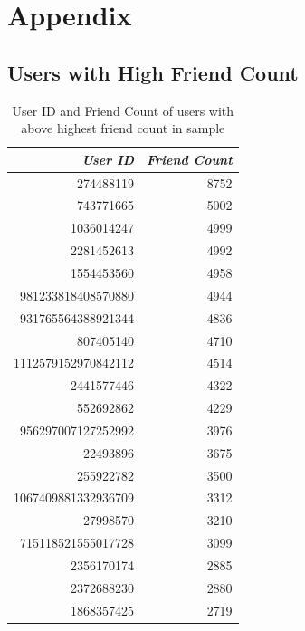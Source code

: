 \documentclass[11pt]{article}
\begin{document}
\section{Appendix}
\label{sec:org1439966}
\subsection{Users with High Friend Count}
\label{sec:orgd18754b}

\begin{table}[htbp]
\caption{\label{tab:org46b5638}User ID and Friend Count of users with above highest friend count in sample}
\centering
\begin{tabular}{rr}
\textbf{\emph{User ID}} & \textbf{\emph{Friend Count}}\\
\hline
274488119 & 8752\\
743771665 & 5002\\
1036014247 & 4999\\
2281452613 & 4992\\
1554453560 & 4958\\
981233818408570880 & 4944\\
931765564388921344 & 4836\\
807405140 & 4710\\
1112579152970842112 & 4514\\
2441577446 & 4322\\
552692862 & 4229\\
956297007127252992 & 3976\\
22493896 & 3675\\
255922782 & 3500\\
1067409881332936709 & 3312\\
27998570 & 3210\\
715118521555017728 & 3099\\
2356170174 & 2885\\
2372688230 & 2880\\
1868357425 & 2719\\
\end{tabular}
\end{table}
\end{document}
